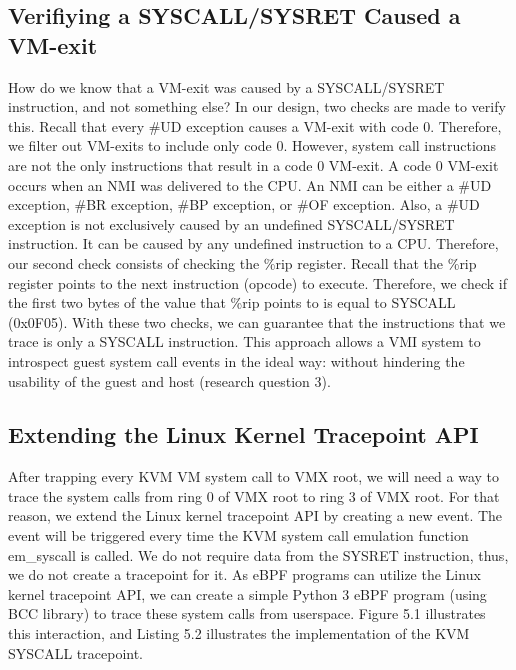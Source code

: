 \documentclass{report}
\begin{document}
\begin{spacing}{1.5}
\subsection{Verifiying a SYSCALL/SYSRET Caused a VM-exit}
{\large
How do we know that a VM-exit was caused by a SYSCALL/SYSRET instruction, and not something else? In our design, two checks are made to verify this. Recall that every \#UD exception causes a VM-exit with code 0. Therefore, we filter out VM-exits to include only code 0. However, system call instructions are not the only instructions that result in a code 0 VM-exit. A code 0 VM-exit occurs when an NMI was delivered to the CPU. An NMI can be either a \#UD exception, \#BR exception, \#BP exception, or \#OF exception. Also, a \#UD exception is not exclusively caused by an undefined SYSCALL/SYSRET instruction. It can be caused by any undefined instruction to a CPU. Therefore, our second check consists of checking the \%rip register. Recall that the \%rip register points to the next instruction (opcode) to execute. Therefore, we check if the first two bytes of the value that \%rip points to is equal to SYSCALL (0x0F05). With these two checks, we can guarantee that the instructions that we trace is only a SYSCALL instruction. This approach allows a VMI system to introspect guest system call events in the ideal way: without hindering the usability of the guest and host (research question 3).
\leavevmode\newline
}





\subsection{Extending the Linux Kernel Tracepoint API}
{\large
After trapping every KVM VM system call to VMX root, we will need a way to trace the system calls from ring 0 of VMX root to ring 3 of VMX root. For that reason, we extend the Linux kernel tracepoint API by creating a new event. The event will be triggered every time the KVM system call emulation function em\_syscall is called. We do not require data from the SYSRET instruction, thus, we do not create a tracepoint for it. As eBPF programs can utilize the Linux kernel tracepoint API, we can create a simple Python  3 eBPF program (using BCC library) to trace these system calls from userspace. Figure 5.1 illustrates this interaction, and Listing 5.2 illustrates the implementation of the KVM SYSCALL tracepoint.
\leavevmode\newline
}













\end{spacing}
\end{document}
